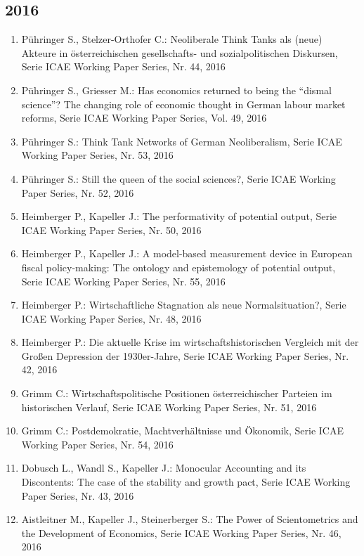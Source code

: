 \subsection*{2016}
\begin{enumerate}
    	 \item Pühringer S., Stelzer-Orthofer C.: Neoliberale Think Tanks als (neue) Akteure in österreichischen gesellschafts- und sozialpolitischen Diskursen, Serie ICAE Working Paper Series, Nr. 44, 2016
	 \item Pühringer S., Griesser M.: Has economics returned to being the “dismal science”? The changing role of economic thought in German labour market reforms, Serie ICAE Working Paper Series, Vol. 49, 2016
	 \item Pühringer S.: Think Tank Networks of German Neoliberalism, Serie ICAE Working Paper Series, Nr. 53, 2016
	 \item Pühringer S.: Still the queen of the social sciences?, Serie ICAE Working Paper Series, Nr. 52, 2016
	 \item Heimberger P., Kapeller J.: The performativity of potential output, Serie ICAE Working Paper Series, Nr. 50, 2016
	 \item Heimberger P., Kapeller J.: A model-based measurement device in European fiscal policy-making: The ontology and epistemology of potential output, Serie ICAE Working Paper Series, Nr. 55, 2016
	 \item Heimberger P.: Wirtschaftliche Stagnation als \glqq neue Normalsituation\grqq{}?, Serie ICAE Working Paper Series, Nr. 48, 2016
	 \item Heimberger P.: Die aktuelle Krise im wirtschaftshistorischen Vergleich mit der Großen Depression der 1930er-Jahre, Serie ICAE Working Paper Series, Nr. 42, 2016
	 \item Grimm C.: Wirtschaftspolitische Positionen österreichischer Parteien im historischen Verlauf, Serie ICAE Working Paper Series, Nr. 51, 2016
	 \item Grimm C.: Postdemokratie, Machtverhältnisse und Ökonomik, Serie ICAE Working Paper Series, Nr. 54, 2016
	 \item Dobusch L., Wandl S., Kapeller J.: Monocular Accounting and its Discontents: The case of the stability and growth pact, Serie ICAE Working Paper Series, Nr. 43, 2016
	 \item Aistleitner M., Kapeller J., Steinerberger S.: The Power of Scientometrics and the Development of Economics, Serie ICAE Working Paper Series, Nr. 46, 2016
\end{enumerate}
